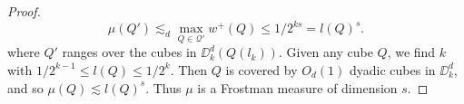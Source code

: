 \begin{proof}
	\[ \mu(Q') \lesssim_d \max_{Q \in \mathcal{Q}'} w^+(Q) \leq 1/2^{ks} = l(Q)^s. \]
	where $Q'$ ranges over the cubes in $\DD_k^d(Q(l_k))$. Given any cube $Q$, we find $k$ with $1/2^{k-1} \leq l(Q) \leq 1/2^k$. Then $Q$ is covered by $O_d(1)$ dyadic cubes in $\DD_k^d$, and so $\mu(Q) \lesssim l(Q)^s$. Thus $\mu$ is a Frostman measure of dimension $s$.
\end{proof}

\begin{comment}

Frostman's lemma implies that to study the Hausdorff dimension of the set, it suffices to understand the class of measures which can be supported on that set. The Fourier dimension of a set also studies this perspective, by slightly refining the measure bound required by the Frostman dimension in frequency space.












\section{Fourier Dimension}

The applicability of Fourier analysis to the analysis of dimension begins by converting the measure bound required on the Frostman dimension onto a condition on the Fourier transform of the measure. For a Borel measure $\mu$, we define the \emph{$s$ energy} of $\mu$ as
%
\[ I_s(\mu) = \int \int \frac{d\mu(x) d\mu(y)}{|x - y|^s}. \]
%
A simple rearrangement shows that for each $y$,
%
\[ \int \int \frac{d\mu(x) d\mu(y)}{|x - y|^s} = s \int_0^\infty \frac{\mu(B(x,r))}{r^{s+1}}\; dr, \]
%
where $B(x,r)$ is the open ball of radius $r$ about the point $x$. This enables us to relate the Frostman bound with energy integrals.


\end{comment}

